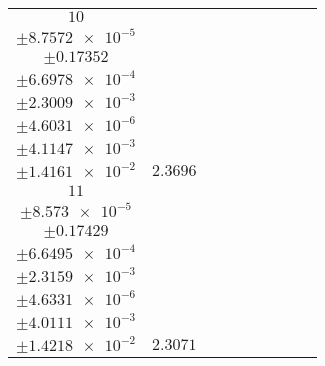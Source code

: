 \documentclass[8pt]{article}
\begin{document}
\begin{longtable}[l]{c c c c c c c c c}
$\num{10}$ & \begin{tabular}[c]{@{}c@{}}$\num{2.9871e-2}$ \\ $\pm\num{8.7572e-5}$\end{tabular} & \begin{tabular}[c]{@{}c@{}}$\num{0.21419}$ \\ $\pm\num{0.17352}$\end{tabular} & \begin{tabular}[c]{@{}c@{}}$\num{-1.9904}$ \\ $\pm\num{6.6978e-4}$\end{tabular} & \begin{tabular}[c]{@{}c@{}}$\num{1.4363e+3}$ \\ $\pm\num{2.3009e-3}$\end{tabular} & \begin{tabular}[c]{@{}c@{}}$\num{2.8735}$ \\ $\pm\num{4.6031e-6}$\end{tabular} & \begin{tabular}[c]{@{}c@{}}$\num{1.1598}$ \\ $\pm\num{4.1147e-3}$\end{tabular} & \begin{tabular}[c]{@{}c@{}}$\num{4.1931}$ \\ $\pm\num{1.4161e-2}$\end{tabular} & $\num{2.3696}$\\
$\num{11}$ & \begin{tabular}[c]{@{}c@{}}$\num{2.9039e-2}$ \\ $\pm\num{8.573e-5}$\end{tabular} & \begin{tabular}[c]{@{}c@{}}$\num{0.31415}$ \\ $\pm\num{0.17429}$\end{tabular} & \begin{tabular}[c]{@{}c@{}}$\num{1.9886}$ \\ $\pm\num{6.6495e-4}$\end{tabular} & \begin{tabular}[c]{@{}c@{}}$\num{1.4403e+3}$ \\ $\pm\num{2.3159e-3}$\end{tabular} & \begin{tabular}[c]{@{}c@{}}$\num{2.8815}$ \\ $\pm\num{4.6331e-6}$\end{tabular} & \begin{tabular}[c]{@{}c@{}}$\num{1.1235}$ \\ $\pm\num{4.0111e-3}$\end{tabular} & \begin{tabular}[c]{@{}c@{}}$\num{4.1776}$ \\ $\pm\num{1.4218e-2}$\end{tabular} & $\num{2.3071}$\\

\end{longtable}
\end{document}
